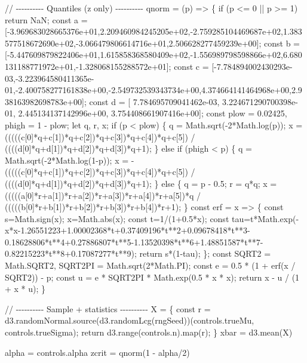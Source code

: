 \documentclass[
  letterpaper,
  DIV=11,
  numbers=noendperiod]{scrreprt}
\newenvironment{Shaded}{\begin{snugshade}}{\end{snugshade}}
\newcommand{\NormalTok}[1]{\textcolor[rgb]{0.00,0.23,0.31}{#1}}
\theoremstyle{definition}
\theoremstyle{plain}
\theoremstyle{definition}
\theoremstyle{remark}
\begin{document}
\begin{Shaded}
\begin{Highlighting}[]
\NormalTok{// {-}{-}{-}{-}{-}{-}{-}{-}{-}{-} Quantiles (z only) {-}{-}{-}{-}{-}{-}{-}{-}{-}{-}}
\NormalTok{qnorm = (p) =\textgreater{} \{}
\NormalTok{  if (p \textless{}= 0 || p \textgreater{}= 1) return NaN;}
\NormalTok{  const a = [{-}3.969683028665376e+01,2.209460984245205e+02,{-}2.759285104469687e+02,1.383577518672690e+02,{-}3.066479806614716e+01,2.506628277459239e+00];}
\NormalTok{  const b = [{-}5.447609879822406e+01,1.615858368580409e+02,{-}1.556989798598866e+02,6.680131188771972e+01,{-}1.328068155288572e+01];}
\NormalTok{  const c = [{-}7.784894002430293e{-}03,{-}3.223964580411365e{-}01,{-}2.400758277161838e+00,{-}2.549732539343734e+00,4.374664141464968e+00,2.938163982698783e+00];}
\NormalTok{  const d = [ 7.784695709041462e{-}03, 3.224671290700398e{-}01, 2.445134137142996e+00, 3.754408661907416e+00];}
\NormalTok{  const plow = 0.02425, phigh = 1 {-} plow;}
\NormalTok{  let q, r, x;}
\NormalTok{  if (p \textless{} plow) \{ q = Math.sqrt({-}2*Math.log(p));}
\NormalTok{    x = (((((c[0]*q+c[1])*q+c[2])*q+c[3])*q+c[4])*q+c[5]) / ((((d[0]*q+d[1])*q+d[2])*q+d[3])*q+1);}
\NormalTok{  \} else if (phigh \textless{} p) \{ q = Math.sqrt({-}2*Math.log(1{-}p));}
\NormalTok{    x = {-}(((((c[0]*q+c[1])*q+c[2])*q+c[3])*q+c[4])*q+c[5]) / ((((d[0]*q+d[1])*q+d[2])*q+d[3])*q+1);}
\NormalTok{  \} else \{ q = p {-} 0.5; r = q*q;}
\NormalTok{    x = (((((a[0]*r+a[1])*r+a[2])*r+a[3])*r+a[4])*r+a[5])*q / (((((b[0]*r+b[1])*r+b[2])*r+b[3])*r+b[4])*r+1);}
\NormalTok{  \}}
\NormalTok{  const erf = x =\textgreater{} \{ const s=Math.sign(x); x=Math.abs(x); const t=1/(1+0.5*x);}
\NormalTok{    const tau=t*Math.exp({-}x*x{-}1.26551223+1.00002368*t+0.37409196*t**2+0.09678418*t**3{-}0.18628806*t**4+0.27886807*t**5{-}1.13520398*t**6+1.48851587*t**7{-}0.82215223*t**8+0.17087277*t**9);}
\NormalTok{    return s*(1{-}tau);}
\NormalTok{  \};}
\NormalTok{  const SQRT2 = Math.SQRT2, SQRT2PI = Math.sqrt(2*Math.PI);}
\NormalTok{  const e = 0.5 * (1 + erf(x / SQRT2)) {-} p;}
\NormalTok{  const u = e * SQRT2PI * Math.exp(0.5 * x * x);}
\NormalTok{  return x {-} u / (1 + x * u);}
\NormalTok{\}}

\NormalTok{// {-}{-}{-}{-}{-}{-}{-}{-}{-}{-} Sample + statistics {-}{-}{-}{-}{-}{-}{-}{-}{-}{-}}
\NormalTok{X = \{}
\NormalTok{  const r = d3.randomNormal.source(d3.randomLcg(rngSeed))(controls.trueMu, controls.trueSigma);}
\NormalTok{  return d3.range(controls.n).map(r);}
\NormalTok{\}}
\NormalTok{xbar = d3.mean(X)}

\NormalTok{alpha = controls.alpha}
\NormalTok{zcrit = qnorm(1 {-} alpha/2)}


\end{Highlighting}
\end{Shaded}
\end{document}
